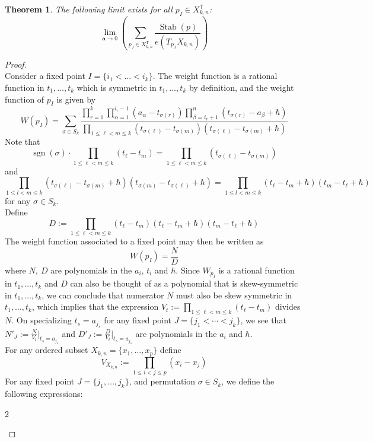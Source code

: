 \documentclass[12 pt]{article}
\theoremstyle{plain}
\newtheorem{theorem}{Theorem}[section]
\theoremstyle{plain}
\theoremstyle{plain}
\theoremstyle{plain}
\theoremstyle{plain}
\theoremstyle{plain}
\theoremstyle{plain}
\theoremstyle{plain}
\theoremstyle{plain}
\theoremstyle{plain}
\theoremstyle{remark}
\theoremstyle{remark}
\theoremstyle{definition}
\theoremstyle{definition}
\theoremstyle{definition}
\theoremstyle{definition}
\theoremstyle{definition}
\theoremstyle{definition}
\DeclareMathOperator{\sgn}{sgn}
\DeclareMathOperator{\Stab}{Stab}
\newcommand{\bT}{\mathsf{T}}
\begin{document}
\begin{theorem}\label{lim-exists} The following limit exists for all $p_I\in X_{k,n}^\bT$:
\[\lim_{\mathbf{a}\to 0} \left( \sum_{p_J\in X_{k,n}^\bT}\frac{\Stab(p)}{e(T_{p_J}X_{k,n})}\right) \]
\end{theorem}
\begin{proof}~\\
Consider a fixed point $I=\{i_{1}<\dots<i_{k}\}$. The weight function is a rational function in $t_{1},\dots, t_{k}$ which is symmetric in $t_{1},\dots,t_{k}$ by definition, and the weight function of $p_{I}$ is given by
\[W(p_I)=\sum\limits_{\sigma \in S_k}\dfrac{\prod\limits_{r = 1}^k \prod\limits_{\alpha = 1}^{i_{r} - 1} (a_{\alpha} - t_{\sigma(r)}) \prod\limits_{\beta = i_r + 1}^n (t_{\sigma(r)} - a_{\beta} + \hbar) }{\prod\limits_{1 \leq \ell < m \leq k} (t_{\sigma(\ell)} - t_{\sigma(m)}) (t_{\sigma (\ell)} - t_{\sigma(m)} + \hbar)}\]
Note that 
\[
\sgn(\sigma)\cdot\prod\limits_{1\leq \ell<m\leq k}(t_{\ell}-t_{m})=\prod\limits_{1\leq \ell<m\leq k}(t_{\sigma(\ell)}-t_{\sigma(m)})\]
and
\[
\prod\limits_{1\leq l<m\leq k}(t_{\sigma(\ell)}-t_{\sigma(m)}+\hbar)(t_{\sigma(m)}-t_{\sigma(\ell)}+\hbar)=\prod\limits_{1\leq l<m\leq k}(t_{\ell}-t_{m}+\hbar)(t_{m}-t_{\ell}+\hbar)\] 
for any $\sigma\in S_{k}$.\\
Define \[
D:=\prod\limits_{1\leq\ell<m\leq k}(t_{\ell}-t_{m})(t_{\ell}-t_{m}+\hbar)(t_{m}-t_{\ell}+\hbar)
\]
The weight function associated to a fixed point may then be written as
\[
 W(p_{I})=\frac{N}{D}
\]
where $N,\ D$ are polynomials in the $a_{i}$, $t_{i}$ and $\hbar$. Since $W_{p_{I}}$ is a rational function in $t_{1},\dots, t_{k}$ and $D$ can also be thought of as a polynomial that is skew-symmetric in $t_{1},\dots,t_{k}$, we can conclude that numerator $N$ must also be skew symmetric in $t_{1},\dots,t_{k}$, which implies that the expression $V_{t}:=\prod\limits_{1\leq\ell<m\leq k}(t_{\ell}-t_{m})$ divides $N$. On specializing $t_{s}=a_{j_{s}}$ for any fixed point $J=\{j_{1}< \cdots < j_{k}\}$, we see that $N'_{J}:=\frac{N}{V_{t}}|_{t_{s}=a_{j_{s}}}$ and $D'_{J}:=\frac{D}{V_{t}}|_{t_{s}=a_{j_{s}}}$ are polynomials in the $a_{i}$ and $\hbar$. \\
For any ordered subset $X_{k,n}=\{x_{1},\dots,x_{p}\}$ define
\[V_{X_{k,n}}:=\prod\limits_{1\leq i<j\leq p}(x_{i}-x_{j})\]
For any fixed point $J=\{j_{1},\dots,j_{k}\}$, and permutation $\sigma \in S_k$, we define the following expressions:
\begin{multicols}{2}
\begin{itemize}

\end{itemize}
\end{multicols}
\end{proof}
\end{document}
